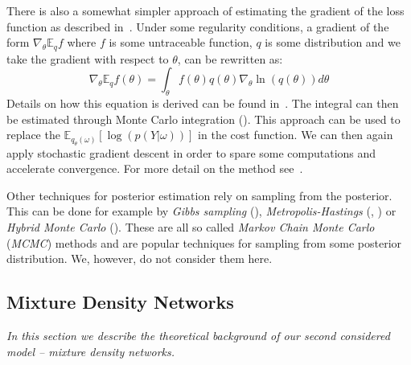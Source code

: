 \documentclass[12pt,a4paper,twoside]{scrartcl}
\numberwithin{equation}{section}
\begin{document}
There is also a somewhat simpler approach of estimating the gradient of the loss function as described in~\cite{paisley2012}. Under some regularity conditions, a gradient of the form \(\nabla_{\theta}\mathbb{E}_qf \) where \(f \) is some untraceable function, \(q\) is some distribution and we take the gradient with respect to \(\theta\), can be rewritten as:
\begin{equation}
  \nabla_{\theta}\mathbb{E}_qf(\theta) = \int_{\theta} f(\theta)q(\theta) \nabla_{\theta}\ln(q(\theta)) d\theta
\end{equation}
Details on how this equation is derived can be found in~\cite{paisley2012}. The integral can then be estimated through Monte Carlo integration (\cite{hammersley1964}). This approach can be used to replace the \(\mathbb{E}_{q_{\theta}(\omega)}[\log(p(Y|\omega))]\) in the cost function. We can then again apply stochastic gradient descent in order to spare some computations and accelerate convergence. For more detail on the method see~\cite{paisley2012}.

Other techniques for posterior estimation rely on sampling from the posterior. This can be done for example by \emph{Gibbs sampling} (\cite{geman1984}), \emph{Metropolis-Hastings} (\cite{metropolis1953}, \cite{hastings1970}) or \emph{Hybrid Monte Carlo} (\cite{duane1987}). These are all so called \emph{Markov Chain Monte Carlo} (\emph{MCMC}) methods and are popular techniques for sampling from some posterior distribution. We, however, do not consider them here.
\subsection{Mixture Density Networks}\label{sec:mdn}
\emph{In this section we describe the theoretical background of our second considered model -- mixture density networks.}
\end{document}
